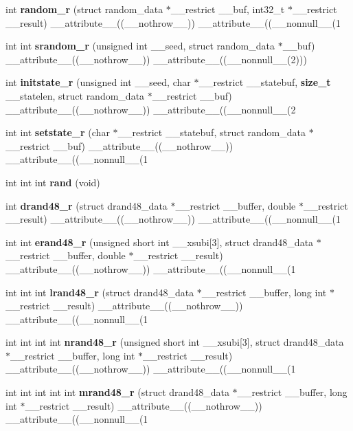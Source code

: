 \begin{DoxyCompactItemize}
int {\bf random\_\-r} (struct random\_\-data $\ast$\_\-\_\-restrict \_\-\_\-buf, int32\_\-t $\ast$\_\-\_\-restrict \_\-\_\-result) \_\-\_\-attribute\_\-\_\-((\_\-\_\-nothrow\_\-\_\-)) \_\-\_\-attribute\_\-\_\-((\_\-\_\-nonnull\_\-\_\-(1
\item 
int int {\bf srandom\_\-r} (unsigned int \_\-\_\-seed, struct random\_\-data $\ast$\_\-\_\-buf) \_\-\_\-attribute\_\-\_\-((\_\-\_\-nothrow\_\-\_\-)) \_\-\_\-attribute\_\-\_\-((\_\-\_\-nonnull\_\-\_\-(2)))
\item 
int {\bf initstate\_\-r} (unsigned int \_\-\_\-seed, char $\ast$\_\-\_\-restrict \_\-\_\-statebuf, {\bf size\_\-t} \_\-\_\-statelen, struct random\_\-data $\ast$\_\-\_\-restrict \_\-\_\-buf) \_\-\_\-attribute\_\-\_\-((\_\-\_\-nothrow\_\-\_\-)) \_\-\_\-attribute\_\-\_\-((\_\-\_\-nonnull\_\-\_\-(2
\item 
int int {\bf setstate\_\-r} (char $\ast$\_\-\_\-restrict \_\-\_\-statebuf, struct random\_\-data $\ast$\_\-\_\-restrict \_\-\_\-buf) \_\-\_\-attribute\_\-\_\-((\_\-\_\-nothrow\_\-\_\-)) \_\-\_\-attribute\_\-\_\-((\_\-\_\-nonnull\_\-\_\-(1
\item 
int int int {\bf rand} (void)
\item 
int {\bf drand48\_\-r} (struct drand48\_\-data $\ast$\_\-\_\-restrict \_\-\_\-buffer, double $\ast$\_\-\_\-restrict \_\-\_\-result) \_\-\_\-attribute\_\-\_\-((\_\-\_\-nothrow\_\-\_\-)) \_\-\_\-attribute\_\-\_\-((\_\-\_\-nonnull\_\-\_\-(1
\item 
int int {\bf erand48\_\-r} (unsigned short int \_\-\_\-xsubi[3], struct drand48\_\-data $\ast$\_\-\_\-restrict \_\-\_\-buffer, double $\ast$\_\-\_\-restrict \_\-\_\-result) \_\-\_\-attribute\_\-\_\-((\_\-\_\-nothrow\_\-\_\-)) \_\-\_\-attribute\_\-\_\-((\_\-\_\-nonnull\_\-\_\-(1
\item 
int int int {\bf lrand48\_\-r} (struct drand48\_\-data $\ast$\_\-\_\-restrict \_\-\_\-buffer, long int $\ast$\_\-\_\-restrict \_\-\_\-result) \_\-\_\-attribute\_\-\_\-((\_\-\_\-nothrow\_\-\_\-)) \_\-\_\-attribute\_\-\_\-((\_\-\_\-nonnull\_\-\_\-(1
\item 
int int int int {\bf nrand48\_\-r} (unsigned short int \_\-\_\-xsubi[3], struct drand48\_\-data $\ast$\_\-\_\-restrict \_\-\_\-buffer, long int $\ast$\_\-\_\-restrict \_\-\_\-result) \_\-\_\-attribute\_\-\_\-((\_\-\_\-nothrow\_\-\_\-)) \_\-\_\-attribute\_\-\_\-((\_\-\_\-nonnull\_\-\_\-(1
\item 
int int int int int {\bf mrand48\_\-r} (struct drand48\_\-data $\ast$\_\-\_\-restrict \_\-\_\-buffer, long int $\ast$\_\-\_\-restrict \_\-\_\-result) \_\-\_\-attribute\_\-\_\-((\_\-\_\-nothrow\_\-\_\-)) \_\-\_\-attribute\_\-\_\-((\_\-\_\-nonnull\_\-\_\-(1

\end{DoxyCompactItemize}
